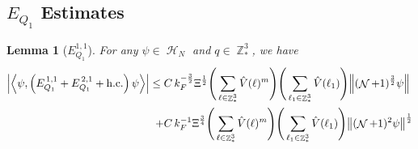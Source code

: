 \documentclass[sn-mathphys, Numbered ,a4paper]{sn-jnl}%
\DeclareMathOperator{\Z}{\mathbb{Z}}
\DeclareMathOperator{\HH}{\mathcal{H}}
\DeclareMathOperator{\NN}{\mathcal{N}}
\newcommand{\half}{\frac{1}{2}}
\newcommand{\eva}[1]{\left\langle #1 \right\rangle}
\theoremstyle{plain}
\newtheorem{lemma}[theorem]{Lemma}
\theoremstyle{definition}
\theoremstyle{remark}
\theoremstyle{plain}
\theoremstyle{definition}
\theoremstyle{remark}
\begin{document}
 \subsection{$E_{Q_1}$ Estimates}
\begin{lemma}[$E_{Q_1}^{1,1}$]\label{lem:EQ111}
For any $\psi \in \HH_N$ and $q \in \Z^3_*$, we have
\begin{alignat}{2}
     \abs{\eva{\psi,\left(E^{\,1,1}_{Q_1}+E^{\,2,1}_{Q_1}+\mathrm{h.c.}\right) \psi }}\nonumber
     \leq \; &C\,  k_{F}^{-\frac{3}{2}} \Xi^\half \Bigg(\sum\limits_{\ell \in \Z^3_*} \hat{V}(\ell)^m\Bigg)\Bigg( \sum\limits_{\ell_1 \in \Z^3_*} \hat{V}(\ell_1) \Bigg) \norm { (\NN+1)^{\frac{3}{2}} \psi }\\
     \;+ &C\, k_{F}^{-1}\Xi^{\frac{3}{4}} \Bigg(\sum\limits_{\ell \in \Z^3_*} \hat{V}(\ell)^m\Bigg) \Bigg(\sum\limits_{\ell_1 \in \Z^3_*} \hat{V}(\ell_1) \Bigg)  \norm{ (\NN+1)^2\psi}^\half \label{eq:estEQ111}
\end{alignat}
\end{lemma}
\end{document}
